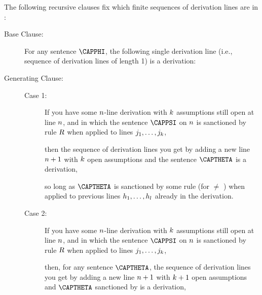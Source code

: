 \begin{majorILnc}{} The following recursive clauses fix which finite sequences of derivation lines are  in \GSD{}:
\begin{description}
\item[Base Clause:] For any \GSL{} sentence $\CAPPHI$, the following single derivation line (i.e., sequence of derivation lines of length 1) is a derivation: 
\begin{gproofnn}
\end{gproofnn}
\item[Generating Clause:] \hfill{}
\begin{description}
\item[Case 1:] If you have some $n$-line derivation with $k$ assumptions still open at line $n$, and in which the sentence $\CAPPSI$ on $n$ is sanctioned by rule $\textsl{R}$ when applied to lines $j_1,\ldots,j_k$, 
\begin{gproofnn}
\glinend{}{}{}
\glinend{}{$\qquad\vdots$}{}
\glinend{}{}{}
\end{gproofnn}
then the sequence of derivation lines you get by adding a new line $n+1$ with $k$ open assumptions and the sentence $\CAPTHETA$ is a derivation,
\begin{gproofnn}
\glinend{}{}{}
\glinend{}{$\qquad\vdots$}{}
\glinend{}{}{}
\end{gproofnn}
so long as $\CAPTHETA$ is sanctioned by some rule  (for  $\neq$ ) when applied to previous lines $h_1,\ldots,h_l$ already in the derivation. 

\item[Case 2:] If you have some $n$-line derivation with $k$ assumptions still open at line $n$, and in which the sentence $\CAPPSI$ on $n$ is sanctioned by rule $\textsl{R}$ when applied to lines $j_1,\ldots,j_k$, 
\begin{gproofnn}
\glinend{}{}{}
\glinend{}{$\qquad\vdots$}{}
\glinend{}{}{}
\end{gproofnn}
then, for any sentence $\CAPTHETA$, the sequence of derivation lines you get by adding a new line $n+1$ with $k+1$ open assumptions and $\CAPTHETA$ sanctioned by  is a derivation,
\begin{gproofnn}
\glinend{}{}{}
\glinend{}{$\qquad\vdots$}{}
\glinend{}{}{}
\end{gproofnn}


\end{description}
\end{description}
\end{majorILnc}
